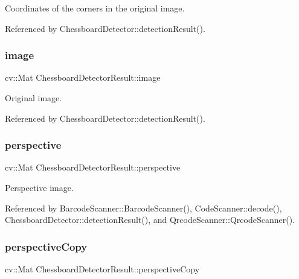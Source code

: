 Coordinates of the corners in the original image. 

Referenced by Chessboard\+Detector\+::detection\+Result().

\mbox{\label{structChessboardDetectorResult_a9cb87f19e643fa012305b5575720332a}} 
\subsubsection{\texorpdfstring{image}{image}}
{\footnotesize\ttfamily cv\+::\+Mat Chessboard\+Detector\+Result\+::image}

Original image. 

Referenced by Chessboard\+Detector\+::detection\+Result().

\mbox{\label{structChessboardDetectorResult_ae36efe72eb31949739d7ce8905ed2f41}} 
\subsubsection{\texorpdfstring{perspective}{perspective}}
{\footnotesize\ttfamily cv\+::\+Mat Chessboard\+Detector\+Result\+::perspective}

Perspective image. 

Referenced by Barcode\+Scanner\+::\+Barcode\+Scanner(), Code\+Scanner\+::decode(), Chessboard\+Detector\+::detection\+Result(), and Qrcode\+Scanner\+::\+Qrcode\+Scanner().

\mbox{\label{structChessboardDetectorResult_a984f12b2b22c6a34a8147aa7d3d3eff0}} 
\subsubsection{\texorpdfstring{perspective\+Copy}{perspectiveCopy}}
{\footnotesize\ttfamily cv\+::\+Mat Chessboard\+Detector\+Result\+::perspective\+Copy}

